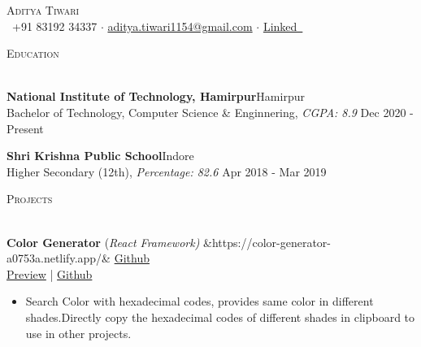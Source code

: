 \documentclass[10pt]{article}
\newcommand{\bulletSep} { \vspace{2.2mm} }
\newcommand{\sectionSep} { \vspace{3mm} }
\newcommand{\lineunder} {
    \vspace*{-8pt} \\
    \hspace*{-15pt} \hrulefill \\
}
\newcommand{\header} [1] {
    {\hspace*{-18pt}\vspace*{6pt} {
        \fontfamily{qcs}\selectfont \large \scshape #1
    }}
    \vspace*{-6pt} \lineunder
    \vspace{0.5mm}
}
\newcommand{\educationItem}[5]{
    \textbf{#1}\hfill #2\\
    #3, \textit{#4} \hfill #5\\
}
\newcommand{\experienceItem}[5]{
    \textbf{#1} \hfill #2 \\
    \textit{#3} \hfill #4 \\
    \begin{itemize}
        #5
    \end{itemize}
}
\newcommand{\projectItem}[5]{
    {\textbf{#1}} {(\sl #2)}\hfill
    \ifx&#3&%
    \href{#4}{Github}\\
    \else
    \href{#3}{Preview} | \href{#4}{Github}\\
    \fi
    \begin{itemize}
        #5
    \end{itemize}
}
\begin{document}

\begin{center}
    {\Huge \scshape {}\selectfont Aditya Tiwari}\\
    \vspace{0.5mm}
    \faPhone~+91 83192 34337
    $\cdot$
    \href{mailto: aditya.tiwari1154@gmail.com}{aditya.tiwari1154@gmail.com}
    $\cdot$
    \href{https://www.linkedin.com/in/aditya-tiwari-438087203/}{Linked\faLinkedinSquare~}
\end{center}

\vspace{-2mm}


\header{Education}

\educationItem{National Institute of Technology, Hamirpur}{Hamirpur}{Bachelor of Technology, Computer Science \& Enginnering}{CGPA: 8.9}{Dec 2020 - Present}
\bulletSep

\educationItem{Shri Krishna Public School}{Indore}{Higher Secondary (12th)}{Percentage: 82.6}{Apr 2018 - Mar 2019}
\sectionSep






\header{Projects}

\projectItem{Color Generator}{React Framework}{https://color-generator-a0753a.netlify.app/}{https://github.com/devloper016/Color-Generator}{
    \item Search Color with hexadecimal codes, provides same color in different
shades.Directly copy the hexadecimal codes of different shades in clipboard to
use in other projects.
}
\bulletSep
\end{document}
